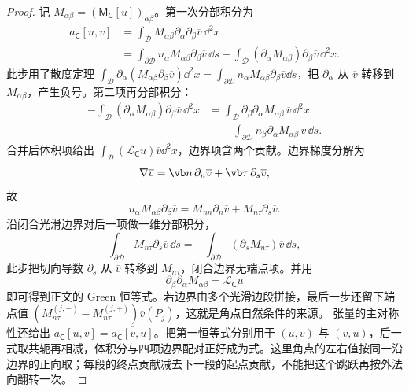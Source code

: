 \begin{proof}
记 \(M_{\alpha\beta}=(\mathsf M_{\mathsf C}[u])_{\alpha\beta}\)。第一次分部积分为
\begin{align*}
 a_{\mathsf C}[u,v]
 &=\int_\mathcal D M_{\alpha\beta}\partial_\alpha\partial_\beta\overline v\,\dd^2x\\
 &=\int_{\partial\mathcal D}n_\alpha M_{\alpha\beta}\partial_\beta\overline v\,\dd s
 -\int_\mathcal D(\partial_\alpha M_{\alpha\beta})\partial_\beta\overline v\,\dd^2x.
\end{align*}
此步用了散度定理 \(\int_\mathcal D\partial_\alpha(M_{\alpha\beta}\partial_\beta\overline v)\dd^2x=\int_{\partial\mathcal D}n_\alpha M_{\alpha\beta}\partial_\beta\overline v\dd s\)，把 \(\partial_\alpha\) 从 \(\overline v\) 转移到 \(M_{\alpha\beta}\)，产生负号。第二项再分部积分：
\begin{align*}
 -\int_\mathcal D(\partial_\alpha M_{\alpha\beta})\partial_\beta\overline v\,\dd^2x
 &=\int_\mathcal D\partial_\beta\partial_\alpha M_{\alpha\beta}\,\overline v\,\dd^2x\\
 &\quad-\int_{\partial\mathcal D}n_\beta\partial_\alpha M_{\alpha\beta}\,\overline v\,\dd s.
\end{align*}
合并后体积项给出 \(\int_\mathcal D(\mathcal L_{\mathsf C}u)\overline v\dd^2x\)，边界项含两个贡献。边界梯度分解为
\[
 \nabla\overline v=\vb n\,\partial_n\overline v+\vb\tau\,\partial_s\overline v,
\]
故
\[
 n_\alpha M_{\alpha\beta}\partial_\beta\overline v
 =M_{nn}\partial_n\overline v+M_{n\tau}\partial_s\overline v.
\]
沿闭合光滑边界对后一项做一维分部积分，
\[
 \int_{\partial\mathcal D}M_{n\tau}\partial_s\overline v\,\dd s
 =-\int_{\partial\mathcal D}(\partial_sM_{n\tau})\overline v\,\dd s,
\]
此步把切向导数 \(\partial_s\) 从 \(\overline v\) 转移到 \(M_{n\tau}\)，闭合边界无端点项。并用
\[
 \partial_\beta\partial_\alpha M_{\alpha\beta}=\mathcal L_{\mathsf C}u
\]
即可得到正文的 Green 恒等式。若边界由多个光滑边段拼接，最后一步还留下端点值
\(
 (M_{n\tau}^{(j,-)}-M_{n\tau}^{(j,+)})\overline v(P_j)
\)，这就是角点自然条件的来源。
张量的主对称性还给出 $a_{\mathsf C}[u,v]=\overline{a_{\mathsf C}[v,u]}$。把第一恒等式分别用于 $(u,v)$ 与 $(v,u)$，后一式取共轭再相减，体积分与四项边界配对正好成为式。这里角点的左右值按同一沿边界的正向取；每段的终点贡献减去下一段的起点贡献，不能把这个跳跃再按外法向翻转一次。

\end{proof}


